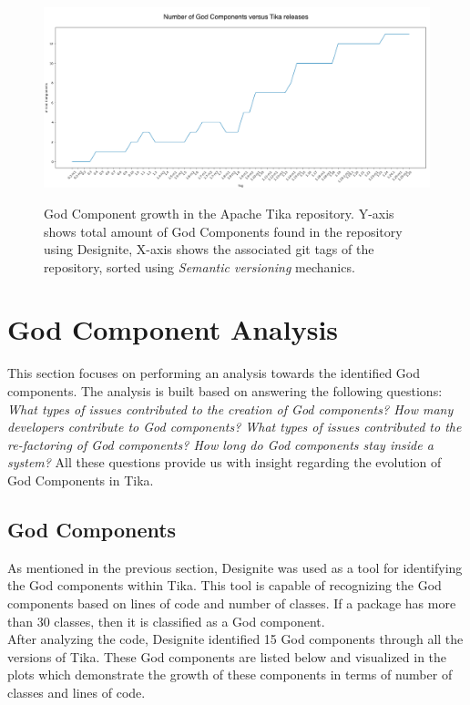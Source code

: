 \documentclass{article}
\begin{document}
\begin{figure}[ht]
    \centering
    \includegraphics[width=\textwidth]{report/images/designite/gcs-versus-tags.png}
    \label{fig:designite/gcs-versus-tags}
    \caption{God Component growth in the Apache Tika repository. Y-axis shows total amount of God Components found in the repository using Designite, X-axis shows the associated git tags of the repository, sorted using \textit{Semantic versioning} mechanics.}
\end{figure}







\section{God Component Analysis}
This section focuses on performing an analysis towards the identified God components. The analysis is built based on answering the following questions: \textit{What types of issues contributed to the creation of God components? How many developers contribute to God components? What types of issues contributed to the re-factoring of God components? How long do God components stay inside a system? }All these questions provide us with insight regarding the evolution of God Components in Tika.

\subsection{God Components}
As mentioned in the previous section, Designite was used as a tool for identifying the God components within Tika. This tool is capable of recognizing the God components based on lines of code and number of classes. If a package has more than 30 classes, then it is classified as a God component.\\
After analyzing the code, Designite identified 15 God components through all the versions of Tika. These God components are listed below and visualized in the plots which demonstrate the growth of these components in terms of number of classes and lines of code.\\
\end{document}

